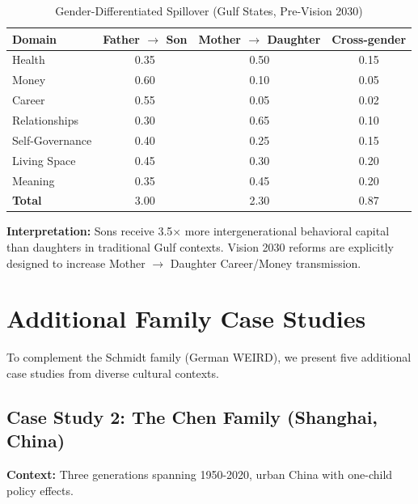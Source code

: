 \begin{table}[htbp]
\centering
\caption{Gender-Differentiated Spillover (Gulf States, Pre-Vision 2030)}
\label{tab:BI-gulf-gender}
\renewcommand{\arraystretch}{1.2}
\small
\begin{tabular}{@{}lccc@{}}
\toprule
\textbf{Domain} & \textbf{Father $\rightarrow$ Son} & \textbf{Mother $\rightarrow$ Daughter} & \textbf{Cross-gender} \\
\midrule
Health & 0.35 & 0.50 & 0.15 \\
Money & \cellcolor{green!25}0.60 & 0.10 & 0.05 \\
Career & \cellcolor{green!25}0.55 & 0.05 & 0.02 \\
Relationships & 0.30 & \cellcolor{green!25}0.65 & 0.10 \\
Self-Governance & 0.40 & 0.25 & 0.15 \\
Living Space & 0.45 & 0.30 & 0.20 \\
Meaning & 0.35 & 0.45 & 0.20 \\
\midrule
\textbf{Total} & 3.00 & 2.30 & 0.87 \\
\bottomrule
\end{tabular}
\end{table}

\textbf{Interpretation:} Sons receive 3.5× more intergenerational behavioral capital than daughters
in traditional Gulf contexts. Vision 2030 reforms are explicitly designed to increase
Mother $\rightarrow$ Daughter Career/Money transmission.


\section{Additional Family Case Studies}
\label{sec:BI-cases}

To complement the Schmidt family (German WEIRD), we present five additional case studies
from diverse cultural contexts.

\subsection{Case Study 2: The Chen Family (Shanghai, China)}

\textbf{Context:} Three generations spanning 1950-2020, urban China with one-child policy effects.

